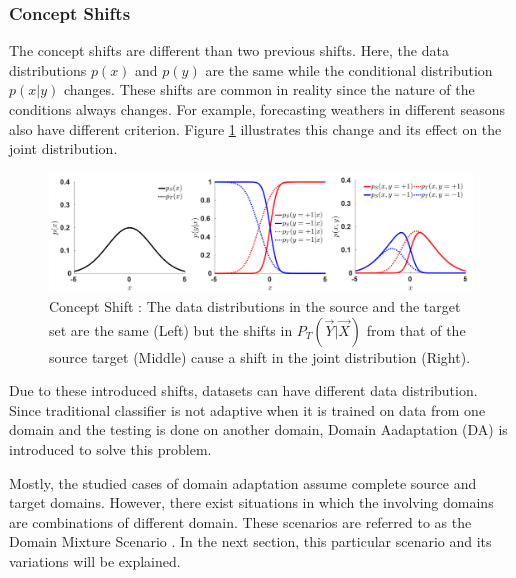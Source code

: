 \subsubsection*{Concept Shifts}
The concept shifts are different than two previous shifts. Here, the data distributions $p(x)$ and $p(y)$ are the same while the conditional distribution $p(x|y)$ changes. These shifts are common in reality since the nature of the conditions always changes. For example, forecasting weathers in different seasons also have different criterion. Figure \ref{fig:conceptShiftPic} illustrates this change and its effect on the joint distribution. 
\begin{figure}[tbh]
  \centering
    \includegraphics[width=\linewidth]{abbildungen/conceptShiftPic.png}
  \caption{Concept Shift \cite{dataShifts}: The data distributions in the source and the target set are the same (Left) but the shifts in $P_T(\vec{Y}|\vec{X})$ from that of the source target (Middle) cause a shift in the joint distribution (Right).} 
  \label{fig:conceptShiftPic}
\end{figure}

Due to these introduced shifts, datasets can have different data distribution. Since traditional classifier is not adaptive when it is trained on data from one domain and the testing is done on another domain, Domain Aadaptation (DA) is introduced to solve this problem. 

Mostly, the studied cases of domain adaptation assume complete source and target domains. However, there exist situations in which the involving domains are combinations of different domain. These scenarios are referred to as the Domain Mixture Scenario \cite{domainMixture}. In the next section, this particular scenario and its variations will be explained.


